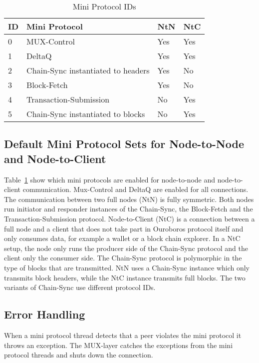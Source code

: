 \documentclass{report}
\newcommand{\wip}[1]{\color{magenta}{#1}\color{black}}
\newcommand{\hide}[1]{}
\theoremstyle{definition}{
  \newtheorem{lemma}{Lemma}[section] %
  \newtheorem{definition}[lemma]{Definition}
}
\theoremstyle{theorem}{
  \newtheorem{invariant}[lemma]{Invariant}
  \newtheorem{proofobligation}[lemma]{Proof Obligation}
}
\numberwithin{equation}{lemma}
\begin{document}
\hide{Update needed !}
\begin{table}[ht]
\centering
\begin{tabular}{|l|l|l|l|}
  \hline
  ID & Mini Protocol                         & NtN  & NtC \\ \hline
  0  & MUX-Control                           & Yes  & Yes \\ \hline
  1  & DeltaQ                                & Yes  & Yes \\ \hline
  2  & Chain-Sync instantiated to headers    & Yes  & No \\ \hline
  3  & Block-Fetch                           & Yes  & No  \\ \hline
  4  & Transaction-Submission                & No   & Yes  \\ \hline
  5  & Chain-Sync instantiated to blocks     & No   & Yes  \\ \hline
\end{tabular}
\caption{Mini Protocol IDs}
\label{mini-protocol-id}
\end{table}

\subsection{Default Mini Protocol Sets for Node-to-Node and Node-to-Client}
Table~\ref{mini-protocol-id} show which mini protocols are enabled for node-to-node
and node-to-client communication.
Mux-Control and DeltaQ are enabled for all connections.
The communication between two full nodes (NtN) is fully symmetric.
Both nodes run initiator and responder instances of the
Chain-Sync, the Block-Fetch and the Transaction-Submission protocol.
Node-to-Client (NtC) is a connection between a full node and a client that does not take part in
Ouroboros protocol itself and only consumes data, for example a wallet or a block chain explorer.
In a NtC setup, the node only runs the producer side of the Chain-Sync protocol and the client only the
consumer side.
The Chain-Sync protocol is polymorphic in the type of blocks that are transmitted.
NtN uses a Chain-Sync instance which only transmits block headers, while the NtC instance transmits
full blocks.
The two variants of Chain-Sync use different protocol IDs.

%
\wip{
\subsection{Time Measurement}
}

\subsection{Error Handling}
When a mini protocol thread detects that a peer violates the mini protocol it throws an exception.
The MUX-layer catches the exceptions from the mini protocol threads and shuts down the connection.
\end{document}
